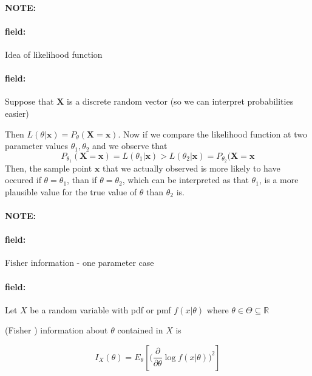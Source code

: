 \documentclass[12pt]{article}
\newenvironment{note}{\paragraph{NOTE:}}{}
\newenvironment{field}{\paragraph{field:}}{}
\begin{document}
\begin{note}
  \begin{field}
    Idea of likelihood function
  \end{field}
  \begin{field}
    Suppose that $\mathbf{X}$ is a discrete random vector (so we can interpret probabilities easier)

    Then $L(\theta|\mathbf{x}) = P_\theta(\mathbf{X} = \mathbf{x})$. Now if we compare the likelihood function at two parameter values $\theta_1, \theta_2$ and we observe that $$P_{\theta_1}(\mathbf{X} = \mathbf{x}) = L(\theta_1|\mathbf{x}) > L(\theta_2|\mathbf{x}) = P_{\theta_2}(\mathbf{X} = \mathbf{x}$$
    Then, the sample point $\mathbf{x}$ that we actually observed is more likely to have occured if $\theta = \theta_1$, than if $\theta= \theta_2$, which can be interpreted as that $\theta_1$, is a more plausible value for the true value of $\theta$ than $\theta_2$ is.
  \end{field}
\end{note}


\begin{note}
  \begin{field}
    Fisher information - one parameter case
  \end{field}
  \begin{field}
    Let $X$ be a random variable with pdf or pmf $f(x |\theta)$ where $\theta \in \Theta \subseteq \mathbb{R}$

    (Fisher ) information about $\theta$ contained in $X$ is

    $$ I_{X}(\theta) = E_\theta[ \big(\frac{\partial}{\partial \theta} \log f(x|\theta)\big)^2]$$
  \end{field}
\end{note}
\end{document}
